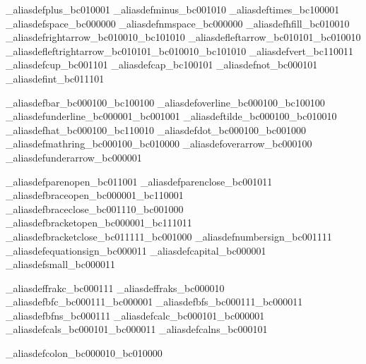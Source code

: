 \brl@char_aliasdef{plus}{\brl@char_bc010001}
\brl@char_aliasdef{minus}{\brl@char_bc001010}
\brl@char_aliasdef{times}{\brl@char_bc100001}
\brl@char_aliasdef{space}{\brl@char@spacetrue\brl@char_bc000000}
\brl@char_aliasdef{nmspace}{\brl@char_bc000000}
\brl@char_aliasdef{hfill}{\brl@char_bc010010}
\brl@char_aliasdef{rightarrow}{\brl@char_bc010010\brl@char_bc101010}
\brl@char_aliasdef{leftarrow}{\brl@char_bc010101\brl@char_bc010010}
\brl@char_aliasdef{leftrightarrow}{\brl@char_bc010101\brl@char_bc010010\brl@char_bc101010}
\brl@char_aliasdef{vert}{\brl@char_bc110011}
\brl@char_aliasdef{cup}{\brl@char_bc001101}
\brl@char_aliasdef{cap}{\brl@char_bc100101}
\brl@char_aliasdef{not}{\brl@char_bc000101}
\brl@char_aliasdef{int}{\brl@char_bc011101}

\brl@char_aliasdef{bar}{\brl@char_bc000100\brl@char_bc100100}
\brl@char_aliasdef{overline}{\brl@char_bc000100\brl@char_bc100100}
\brl@char_aliasdef{underline}{\brl@char_bc000001\brl@char_bc001001}
\brl@char_aliasdef{tilde}{\brl@char_bc000100\brl@char_bc010010}
\brl@char_aliasdef{hat}{\brl@char_bc000100\brl@char_bc110010}
\brl@char_aliasdef{dot}{\brl@char_bc000100\brl@char_bc001000}
\brl@char_aliasdef{mathring}{\brl@char_bc000100\brl@char_bc010000}
\brl@char_aliasdef{overarrow}{\brl@char_bc000100}
\brl@char_aliasdef{underarrow}{\brl@char_bc000001}



\brl@char_aliasdef{parenopen}{\brl@char_bc011001}%
\brl@char_aliasdef{parenclose}{\brl@char_bc001011}%
\brl@char_aliasdef{braceopen}{\brl@char_bc000001\brl@char_bc110001}%
\brl@char_aliasdef{braceclose}{\brl@char_bc001110\brl@char_bc001000}%
\brl@char_aliasdef{bracketopen}{\brl@char_bc000001\brl@char_bc111011}%
\brl@char_aliasdef{bracketclose}{\brl@char_bc011111\brl@char_bc001000}%
\brl@char_aliasdef{numbersign}{\brl@char_bc001111}
\brl@char_aliasdef{equationsign}{\brl@char_bc000011}
\brl@char_aliasdef{capital}{\brl@char_bc000001}
\brl@char_aliasdef{small}{\brl@char_bc000011}

\brl@char_aliasdef{frakc}{\brl@char_bc000111}
\brl@char_aliasdef{fraks}{\brl@char_bc000010}
\brl@char_aliasdef{bfc}{\brl@char_bc000111\brl@char_bc000001}
\brl@char_aliasdef{bfs}{\brl@char_bc000111\brl@char_bc000011}
\brl@char_aliasdef{bfns}{\brl@char_bc000111}
\brl@char_aliasdef{calc}{\brl@char_bc000101\brl@char_bc000001}
\brl@char_aliasdef{cals}{\brl@char_bc000101\brl@char_bc000011}
\brl@char_aliasdef{calns}{\brl@char_bc000101}

\brl@char_aliasdef{colon}{\brl@char_bc000010\brl@char_bc010000}



